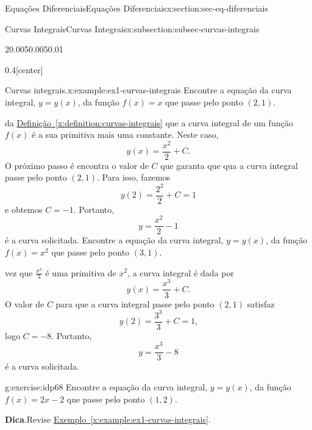 \documentclass[oneside,10pt,]{article}
\newcommand{\blocktitlefont}{\relax}
\newcommand{\xreffont}{\relax}
\numberwithin{equation}{section}
\begin{document}
\begin{sectionptx}{Equações Diferenciais}{}{Equações Diferenciais}{}{}{x:section:sec-eq-diferenciais}
\begin{subsectionptx}{Curvas Integrais}{}{Curvas Integrais}{}{}{x:subsection:subsec-curvas-integrais}
\begin{sidebyside}{2}{0.005}{0.005}{0.01}
\begin{sbspanel}{0.4}[center]
\end{sbspanel}%
\end{sidebyside}%
%
\begin{example}{Curvas integrais.}{x:example:ex1-curvas-integrais}%
Encontre a equação da curva integral, \(y=y(x)\), da função \(f(x)=x\) que passe pelo ponto \((2,1)\).%
\par\smallskip%
\noindentSegue da \hyperref[x:definition:curvas-integrais]{Definição~{\xreffont\ref{x:definition:curvas-integrais}}} que a curva integral de um função \(f(x)\) é a sua primitiva mais uma constante. Neste caso,%
\begin{equation*}
y(x)= \frac{x^2}{2} + C\text{.}
\end{equation*}
O próximo passo é encontra o valor de \(C\) que garanta que qua a curva integral passe pelo ponto \((2,1)\). Para isso, fazemos%
\begin{equation*}
y(2)= \frac{2^2}{2} + C = 1
\end{equation*}
e obtemos \(C=-1\). Portanto,%
\begin{equation*}
y=\frac{x^2}{2} -1
\end{equation*}
é a curva solicitada.%
 Encontre a equação da curva integral, \(y=y(x)\),  da função \(f(x)=x^2\) que passe pelo ponto \((3,1)\).%
\par\smallskip%
\noindentUma vez que \(\frac{x^3}{3}\) é uma primitiva de \(x^2\), a curva integral é dada por%
\begin{equation*}
y(x)= \frac{x^3}{3} + C\text{.}
\end{equation*}
O valor de \(C\) para que  a curva integral passe pelo ponto \((2,1)\) satisfaz%
\begin{equation*}
y(2)= \frac{3^3}{3} + C = 1\text{,}
\end{equation*}
logo \(C=-8\). Portanto,%
\begin{equation*}
y=\frac{x^3}{3} -8
\end{equation*}
é a curva solicitada.%
%
\end{example}
\begin{inlineexercise}{}{g:exercise:idp68}%
Encontre a equação da curva integral, \(y=y(x)\),  da função \(f(x)=2x-2\) que passe pelo ponto \((1,2)\).%
\par\smallskip%
\noindent\textbf{\blocktitlefont Dica}.\hypertarget{g:hint:idp69}{}\quad{}Revise \hyperref[x:example:ex1-curvas-integrais]{Exemplo~{\xreffont\ref{x:example:ex1-curvas-integrais}}}.%

\end{inlineexercise}
\end{subsectionptx}
\end{sectionptx}
\end{document}
